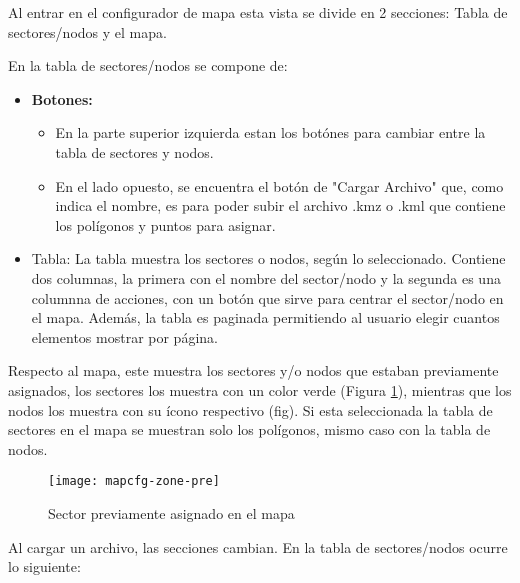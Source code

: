 Al entrar en el configurador de mapa esta vista se divide en 2 secciones: Tabla de sectores/nodos y el mapa.

En la tabla de sectores/nodos se compone de:

\begin{itemize}
    \item \textbf{Botones:}
          \begin{itemize}
              \item En la parte superior izquierda estan los botónes para cambiar entre la tabla de sectores y nodos.
              \item En el lado opuesto, se encuentra el botón de "Cargar Archivo" que, como indica el nombre, es para poder subir el archivo .kmz o .kml que contiene los polígonos y puntos para asignar.
          \end{itemize}
    \item Tabla: La tabla muestra los sectores o nodos, según lo seleccionado. Contiene dos columnas, la primera con el nombre del sector/nodo y la segunda es una columnna de acciones, con un botón que sirve para centrar el sector/nodo en el mapa. Además, la tabla es paginada permitiendo al usuario elegir cuantos elementos mostrar por página.
\end{itemize}

Respecto al mapa, este muestra los sectores y/o nodos que estaban previamente asignados, los sectores los muestra con un color verde (Figura \ref{fig:mapcfg-zone-pre}), mientras que los nodos los muestra con su ícono respectivo (fig). Si esta seleccionada la tabla de sectores en el mapa se muestran solo los polígonos, mismo caso con la tabla de nodos.
\begin{figure}[H]
	\centering
	\texttt{[image: mapcfg-zone-pre]}
	\caption{\label{fig:mapcfg-zone-pre} Sector previamente asignado en el mapa}
\end{figure}

Al cargar un archivo, las secciones cambian. En la tabla de sectores/nodos ocurre lo siguiente:

